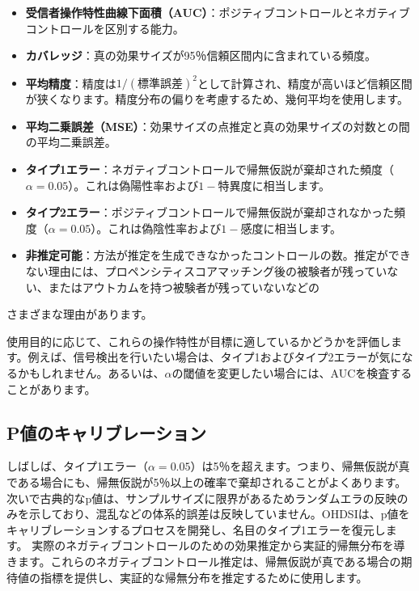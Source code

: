 \documentclass[
  11pt]{book}
\providecommand{\tightlist}{%
  \setlength{\itemsep}{0pt}\setlength{\parskip}{0pt}}
\theoremstyle{definition}
\theoremstyle{definition}
\theoremstyle{definition}
\theoremstyle{definition}
\theoremstyle{remark}
\begin{document}
\begin{itemize}
\tightlist
\item
  \textbf{受信者操作特性曲線下面積（AUC）}：ポジティブコントロールとネガティブコントロールを区別する能力。
\item
  \textbf{カバレッジ}：真の効果サイズが95％信頼区間内に含まれている頻度。
\item
  \textbf{平均精度}：精度は\(1/(標準誤差)^2\)として計算され、精度が高いほど信頼区間が狭くなります。精度分布の偏りを考慮するため、幾何平均を使用します。
\item
  \textbf{平均二乗誤差（MSE）}：効果サイズの点推定と真の効果サイズの対数との間の平均二乗誤差。
\item
  \textbf{タイプ1エラー}：ネガティブコントロールで帰無仮説が棄却された頻度（\(\alpha = 0.05\)）。これは偽陽性率および\(1 - 特異度\)に相当します。
\item
  \textbf{タイプ2エラー}：ポジティブコントロールで帰無仮説が棄却されなかった頻度（\(\alpha = 0.05\)）。これは偽陰性率および\(1 - 感度\)に相当します。
\item
  \textbf{非推定可能}：方法が推定を生成できなかったコントロールの数。推定ができない理由には、プロペンシティスコアマッチング後の被験者が残っていない、またはアウトカムを持つ被験者が残っていないなどの
\end{itemize}

さまざまな理由があります。

使用目的に応じて、これらの操作特性が目標に適しているかどうかを評価します。例えば、信号検出を行いたい場合は、タイプ1およびタイプ2エラーが気になるかもしれません。あるいは、\(\alpha\)の閾値を変更したい場合には、AUCを検査することがあります。

\subsection{P値のキャリブレーション}\label{pux5024ux306eux30adux30e3ux30eaux30d6ux30ecux30fcux30b7ux30e7ux30f3}

 

しばしば、タイプ1エラー（\(\alpha = 0.05\)）は5％を超えます。つまり、帰無仮説が真である場合にも、帰無仮説が5％以上の確率で棄却されることがよくあります。次いで古典的なp値は、サンプルサイズに限界があるためランダムエラの反映のみを示しており、混乱などの体系的誤差は反映していません。OHDSIは、p値をキャリブレーションするプロセスを開発し、名目のタイプ1エラーを復元します。\citep{schuemie_2014} 実際のネガティブコントロールのための効果推定から実証的帰無分布を導きます。これらのネガティブコントロール推定は、帰無仮説が真である場合の期待値の指標を提供し、実証的な帰無分布を推定するために使用します。
\end{document}
